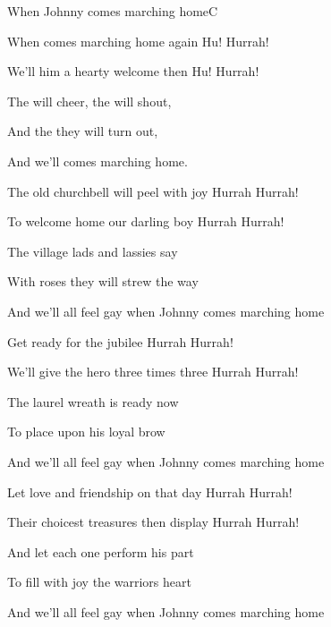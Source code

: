 \begin{song}{When Johnny comes marching home}{C}{}

\begin{SBVerse}

When  comes marching home again Hu! Hurrah!

We’ll  him a hearty welcome then Hu! Hurrah!

The  will cheer, the  will shout,

And the  they will  turn out,

And we’ll      comes marching home.

\end{SBVerse}

\begin{SBVerse}

The old churchbell will peel with joy Hurrah Hurrah!

To welcome home our darling boy Hurrah Hurrah!

The village lads and lassies say

With roses they will strew the way

And we’ll all feel gay when Johnny comes marching home

\end{SBVerse}

\begin{SBVerse}

Get ready for the jubilee Hurrah Hurrah!

We’ll give the hero three times three Hurrah Hurrah!

The laurel wreath is ready now

To place upon his loyal brow

And we’ll all feel gay when Johnny comes marching home

\end{SBVerse}

\begin{SBVerse}

Let love and friendship on that day Hurrah Hurrah!

Their choicest treasures then display Hurrah Hurrah!

And let each one perform his part

To fill with joy the warriors heart

And we’ll all feel gay when Johnny comes marching home

\end{SBVerse}

\end{song}

\clearpage
